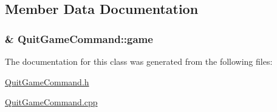 \subsection{Member Data Documentation}
\hypertarget{class_quit_game_command_a44707efd79f562af0b78b40920365ee3}{}
\subsubsection[{game}]{\& Quit\+Game\+Command\+::game\hspace{0.3cm}{\ttfamily [private]}}\label{class_quit_game_command_a44707efd79f562af0b78b40920365ee3}


The documentation for this class was generated from the following files\+:\begin{DoxyCompactItemize}
\item 
\hyperlink{_quit_game_command_8h}{Quit\+Game\+Command.\+h}\item 
\hyperlink{_quit_game_command_8cpp}{Quit\+Game\+Command.\+cpp}\end{DoxyCompactItemize}

